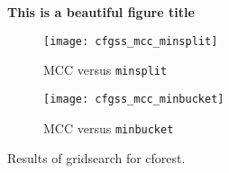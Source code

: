 \begin{figure}[htp]
    \centering
    \textbf{This is a beautiful figure title}\par\medskip
    \begin{subfigure}[b]{.3\textwidth}
        \centering
        \texttt{[image: cfgss\_mcc\_minsplit]}
        \cprotect\caption{MCC versus \verb|minsplit|}
        \label{fig:cfgss_mcc_minsplit}
    \end{subfigure}
    \hfill
    \begin{subfigure}[b]{.3\textwidth}
        \centering
        \texttt{[image: cfgss\_mcc\_minbucket]}
        \cprotect\caption{MCC versus \verb|minbucket|}
        \label{fig:cfgss_mcc_minbucket}
    \end{subfigure}
    \hspace*{\fill}

    \caption{Results of gridsearch for cforest.}
\end{figure}
